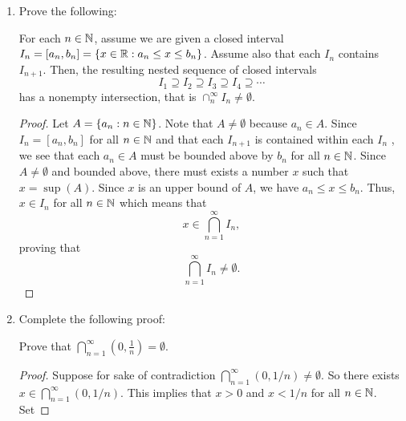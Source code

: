 \documentclass[11pt,a4paper]{article}
\begin{document}
\begin{enumerate}
\begin{enumerate}
\begin{proof}
            \end{proof}
    \end{enumerate}
    \item Prove the following:
        \begin{theorem}
            For each \( n \in \mathbb{N}  \), assume we are given a closed interval \( {I}_{n} = [{a}_{n}, {b}_{n}] = \{ x \in \mathbb{R} : {a}_{n} \leq x \leq {b}_{n} \}  \). Assume also that each \( {I}_{n} \) contains \( {I}_{n+1} \). Then, the resulting nested sequence of closed intervals
            \[  {I}_{1} \supseteq {I}_{2} \supseteq {I}_{3} \supseteq {I}_{4} \supseteq \cdots \]
            has a nonempty intersection, that is \( \cap_{n}^{\infty } {I}_{n} \neq \emptyset \).
        \end{theorem}
        \begin{proof}
            Let \( A = \{ {a}_{n} : n \in \mathbb{N}  \}  \). Note that \( A \neq \emptyset \) because \( {a}_{n} \in A  \). Since \( {I}_{n} = [{a}_{n}, {b}_{n}]  \) for all \( n \in \mathbb{N}  \) and that each \( {I}_{n+1} \) is contained within each \( {I}_{n} \) , we see that each \( {a}_{n} \in A  \) must be bounded above by \( {b}_{n} \) for all \( n \in \mathbb{N}  \). Since \( A \neq \emptyset  \) and bounded above, there must exists a number \( x  \) such that \( x = \sup(A) \). Since \( x  \) is an upper bound of \( A  \), we have \( {a}_{n} \leq x \leq {b}_{n}  \). Thus, \( x \in {I}_{n}  \) for all \( n \in \mathbb{N}  \) which means that  
            \[  x \in \bigcap_{ n=1  }^{ \infty  }  {I}_{n}, \]
            proving that 
            \[  \bigcap_{ n = 1  }^{ \infty  } {I}_{n} \neq \emptyset. \]
        \end{proof}
    \item Complete the following proof:

        Prove that \( \bigcap_{ n = 1  }^{ \infty  } (0, \frac{ 1 }{ n } ) = \emptyset \). 
        \begin{proof}
        Suppose for sake of contradiction \( \bigcap_{ n=1  }^{ \infty  } (  0, 1/n   ) \neq \emptyset  \). So there exists \( x \in \bigcap_{ n=1 }^{ \infty  } (0, 1/n) \). This implies that \( x > 0  \) and \( x < 1/n \) for all \( n \in \mathbb{N}  \). Set 
        \end{proof}
\end{enumerate}
\end{document}
